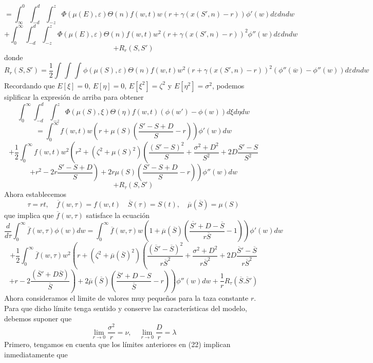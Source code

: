 \documentclass[12pt,a4paper]{article}
\begin{document}
$$=\int^{0}_{\infty} \int^{d}_{-d} \int^{z}_{-z} \Phi(\mu(E),\varepsilon)\Theta(n)f(w,t)w(r+\gamma(x(S',n)-r))\phi'(w) d\varepsilon dn dw$$
$$ +\int^{\infty}_{0}\int^{d}_{-d}\int^{z}_{-z} \Phi(\mu(E),\varepsilon)\Theta(n)f(w,t)w^{2}(r+\gamma(x(S',n)-r))^{2}\phi''(w) d\varepsilon dn dw$$
$$ +R_r(S,S')$$
donde
\begin{equation}
R_r(S,S')=\frac{1}{2}\int^{}_{}\int^{}_{}\int^{}_{} \phi(\mu(S),\varepsilon)\Theta(n)f(w,t)w^{2}(r+\gamma(x(S',n)-r))^2(\phi''(\overline{w})-\phi''(w)) d\varepsilon dn dw
\end{equation}
Recordando que $E[\xi]=0$, $E[\eta]=0$, $E[\xi^{2}]=\zeta^{2}$ y $E[\eta^{2}]=\sigma^{2}$, podemos siplificar la expresión de arriba para obtener
$$
\int^{\infty}_{0}\int^{d}_{-d}\int^{z}_{-z}\Phi(\mu(S),\xi)\Theta (\eta) f(w,t)(\phi(w')-\phi(w))d\xi d\eta dw
$$ 
$$
=\int^{\infty}_{0}f(w,t)w\left(r+\mu(S)\left(\frac{S'-S+D}{S}-r\right)\right)\phi'(w)dw
$$
$$
+\frac{1}{2}\int^{\infty}_{0}f(w,t)w^{2}\left(r^{2}+(\zeta^{2}+\mu(S)^2)\left( \frac{(S'-S)^2}{S}+\frac{\sigma^2 +D^2}{S^2}+2D\frac{S'-S}{S^2}\right.\right.
$$
$$
\left.\left.+ r^2 -2r\frac{S'-S+D}{S}\right)+2r\mu(S)\left( \frac{S'-S+D}{S}-r\right)\right)\phi''(w)dw
$$
$$
+R_{\tau}(S,S')
$$
Ahora establecemos
$$
\tau = rt,\quad \overline{f}(w,\tau)=f(w,t) \quad \overline{S}(\tau)=S(t),\quad \overline{\mu}(\overline{S})=\mu(S) 
$$
que implica que $\overline{f}(w,\tau)$ satisface la ecuación
$$
\frac{d}{d\tau}\int^{\infty}_{0}\overline{f}(w,\tau)\phi(w)dw
=\int^{\infty}_{0} \overline{f}(w,\tau)w\left(1+\overline{\mu}(\overline{S})\left( \frac{\overline{S'}+D-\overline{S}}{r\overline{S}}-1\right)\right)\phi'(w)dw
$$
$$
+\frac{1}{2}\int^{\infty}_{0}\overline{f}(w,\tau)w^{2}\left( 
r+(\zeta^2+\overline{\mu}(\overline{S})^2) \left(\frac{(\overline{S}'-\overline{S})^2}{r\overline{S}^2} +\frac{\sigma^2+D^2}{r\overline{S}^2} + 2D\frac{\overline{S}'-\overline{S}}{r\overline{S}^2}\right. \right.
$$
$$
\left.\left.+r -2\frac{(\overline{S}'+D\overline{S})}{\overline{S}}\right)+2\overline{\mu}(\overline{S})\left(\frac{\overline{S}'+D-S}{\overline{S}}-r\right)\right)\phi''(w)dw+\frac{1}{r}R_{\tau}(\overline{S}.\overline{S}')
$$
Ahora consideramos el limite de valores muy pequeños para la taza constante $r$. Para que dicho límite tenga sentido y conserve las características del modelo, debemos suponer que
\begin{equation}
\lim_{r\rightarrow 0}\frac{\sigma^2}{r}=\nu,\quad \lim_{r\rightarrow 0}\frac{D}{r}=\lambda 
\end{equation}
Primero, tengamos en cuenta que los límites anteriores en (22) implican inmediatamente que
\end{document}
